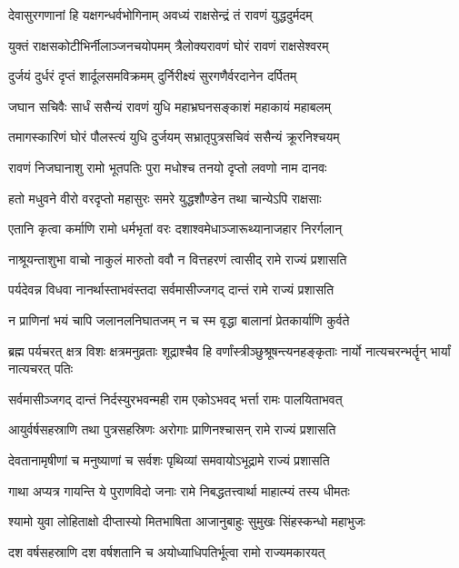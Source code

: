 \twolineshloka
{देवासुरगणानां हि यक्षगन्धर्वभोगिनाम्}
{अवध्यं राक्षसेन्द्रं तं रावणं युद्धदुर्मदम्}%

\twolineshloka
{युक्तं राक्षसकोटीभिर्नीलाञ्जनचयोपमम्}
{त्रैलोक्यरावणं घोरं रावणं राक्षसेश्वरम्}%

\twolineshloka
{दुर्जयं दुर्धरं दृप्तं शार्दूलसमविक्रमम्}
{दुर्निरीक्ष्यं सुरगणैर्वरदानेन दर्पितम्}%

\twolineshloka
{जघान सचिवैः सार्धं ससैन्यं रावणं युधि}
{महाभ्रघनसङ्काशं महाकायं महाबलम्}%

\twolineshloka
{तमागस्कारिणं घोरं पौलस्त्यं युधि दुर्जयम्}
{सभ्रातृपुत्रसचिवं ससैन्यं क्रूरनिश्चयम्}%

\twolineshloka
{रावणं निजघानाशु रामो भूतपतिः पुरा}
{मधोश्च तनयो दृप्तो लवणो नाम दानवः}%

\twolineshloka
{हतो मधुवने वीरो वरदृप्तो महासुरः}
{समरे युद्धशौण्डेन तथा चान्येऽपि राक्षसाः}%

\twolineshloka
{एतानि कृत्वा कर्माणि रामो धर्मभृतां वरः}
{दशाश्वमेधाञ्जारूथ्यानाजहार निरर्गलान्}%

\twolineshloka
{नाश्रूयन्ताशुभा वाचो नाकुलं मारुतो ववौ}
{न वित्तहरणं त्वासीद् रामे राज्यं प्रशासति}%

\twolineshloka
{पर्यदेवन्न विधवा नानर्थास्ताभवंस्तदा}
{सर्वमासीज्जगद् दान्तं रामे राज्यं प्रशासति}%

\twolineshloka
{न प्राणिनां भयं चापि जलानलनिघातजम्}
{न च स्म वृद्धा बालानां प्रेतकार्याणि कुर्वते}%


\threelineshloka
{ब्रह्म पर्यचरत् क्षत्र विशः क्षत्रमनुव्रताः}
{शूद्राश्चैव हि वर्णांस्त्रीञ्छुश्रूषन्त्यनहङ्कृताः}
{नार्यो नात्यचरन्भर्तॄन् भार्यां नात्यचरत् पतिः}%

\twolineshloka
{सर्वमासीञ्जगद् दान्तं निर्दस्युरभवन्मही}
{राम एकोऽभवद् भर्त्ता रामः पालयिताभवत्}%

\twolineshloka
{आयुर्वर्षसहस्राणि तथा पुत्रसहस्रिणः}
{अरोगाः प्राणिनश्चासन् रामे राज्यं प्रशासति}%

\twolineshloka
{देवतानामृषीणां च मनुष्याणां च सर्वशः}
{पृथिव्यां समवायोऽभूद्रामे राज्यं प्रशासति}%

\twolineshloka
{गाथा अप्यत्र गायन्ति ये पुराणविदो जनाः}
{रामे निबद्धतत्त्वार्था माहात्म्यं तस्य धीमतः}%

\twolineshloka
{श्यामो युवा लोहिताक्षो दीप्तास्यो मितभाषिता}
{आजानुबाहुः सुमुखः सिंहस्कन्धो महाभुजः}%

\twolineshloka
{दश वर्षसहस्राणि दश वर्षशतानि च}
{अयोध्याधिपतिर्भूत्वा रामो राज्यमकारयत्}%

